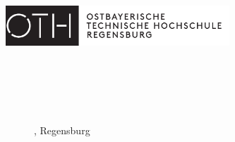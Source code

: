\begin{titlepage}
	\includegraphics[height=1.5cm]{Logo/oth_logo_neu.eps}
	\vspace{1cm}
	\begin{center}       
        \spacedallcaps{\small{\myUni}} \\
        \spacedallcaps{\small{\myFaculty}} \\ \vspace*{2\baselineskip}
		\Large     
        \begingroup
        	 \\ \vspace*{2\baselineskip}
            \textbf{\myTitle} \\
        \endgroup
        \large
        \vspace*{10\baselineskip}
	
    	
    	\begin{figure}[b]
    		\begin{center}
		    	\myTime, Regensburg
	    	\end{center}
    	\end{figure}
    \end{center}
\end{titlepage}   